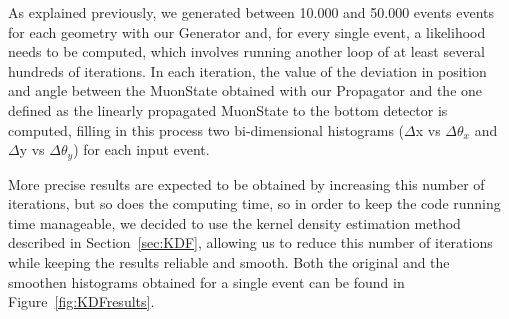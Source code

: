\documentclass[a4paper, 11pt, twoside, openright]{report}
\begin{document}
As explained previously, we generated between 10.000 and 50.000 events events for each geometry with our Generator and, for every single event, a likelihood needs to be computed, which involves running another loop of at least several hundreds of iterations. In each iteration, the value of the deviation in position and angle between the MuonState obtained with our Propagator and the one defined as the linearly propagated MuonState to the bottom detector is computed, filling in this process two bi-dimensional histograms ($\Delta$x vs $\Delta \theta_x$ and $\Delta$y vs $\Delta \theta_y$) for each input event.

More precise results are expected to be obtained by increasing this number of iterations, but so does the computing time, so in order to keep the code running time manageable, we decided to use the kernel density estimation method described in Section~\ref{sec:KDF}, allowing us to reduce this number of iterations while keeping the results reliable and smooth. Both the original and the smoothen histograms obtained for a single event can be found in Figure~\ref{fig:KDFresults}.
\end{document}
